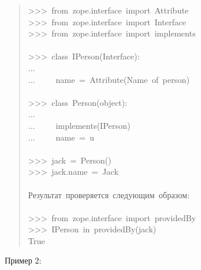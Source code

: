 \documentclass[14pt,a4paper,openany,twoside,final]{extbook}
\begin{document}
\begin{quote}{\ttfamily \raggedright \noindent
>{}>{}>~from~zope.interface~import~Attribute\\
>{}>{}>~from~zope.interface~import~Interface\\
>{}>{}>~from~zope.interface~import~implements\\
~\\
>{}>{}>~class~IPerson(Interface):\\
...\\
...~~~~~name~=~Attribute(\textquotedbl{}Name~of~person\textquotedbl{})\\
~\\
>{}>{}>~class~Person(object):\\
...\\
...~~~~~implements(IPerson)\\
...~~~~~name~=~u\textquotedbl{}\textquotedbl{}\\
~\\
>{}>{}>~jack~=~Person()\\
>{}>{}>~jack.name~=~\textquotedbl{}Jack\textquotedbl{}\\
~\\
Результат~проверяется~следующим~образом:\\
~\\
>{}>{}>~from~zope.interface~import~providedBy\\
>{}>{}>~IPerson~in~providedBy(jack)\\
True
}
\end{quote}

Пример 2:
\end{document}
